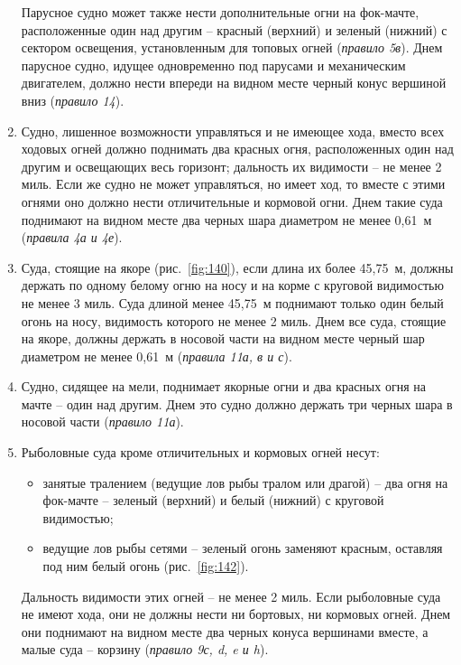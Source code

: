 \documentclass[a4paper, 12pt, twoside, final]{scrbook}
\begin{document}
\begin{enumerate}
Парусное судно может также нести дополнительные огни на фок-мачте, расположенные один над другим \--- красный (верхний) и зеленый (нижний) с сектором освещения, установленным для топовых огней (\textit{правило 5в}). Днем парусное судно, идущее одновременно под парусами и механическим двигателем, должно нести впереди на видном месте черный конус вершиной вниз (\textit{правило 14}).

\item Судно, лишенное возможности управляться и не имеющее хода, вместо всех ходовых огней должно поднимать два красных огня, расположенных один над другим и освещающих весь горизонт; дальность их видимости \--- не менее 2 миль. Если же судно не может управляться, но имеет ход, то вместе с этими огнями оно должно нести отличительные и кормовой огни. Днем такие суда поднимают на видном месте два черных шара диаметром не менее 0,61~м (\textit{правила 4а и 4е}).

\item Суда, стоящие на якоре (рис.~\ref{fig:140}), если длина их более 45,75~м, должны держать по одному белому огню на носу и на корме с круговой видимостью не менее 3 миль. Суда длиной менее 45,75~м поднимают только один белый огонь на носу, видимость которого не менее 2 миль. Днем все суда, стоящие на якоре, должны держать в носовой части на видном месте черный шар диаметром не менее 0,61~м (\textit{правила 11а, в и с}).

\item Судно, сидящее на мели, поднимает якорные огни и два красных огня на мачте \--- один над другим. Днем это судно должно держать три черных шара в носовой части (\textit{правило 11а}).

\item Рыболовные суда кроме отличительных и кормовых огней несут:
\begin{itemize}
\item занятые тралением (ведущие лов рыбы тралом или драгой) \--- два огня на фок-мачте \--- зеленый (верхний) и белый (нижний)  с круговой  видимостью;
\item ведущие лов рыбы сетями \--- зеленый огонь заменяют красным, оставляя под ним белый огонь (рис.~\ref{fig:142}).
\end{itemize}

Дальность видимости этих огней \--- не менее 2 миль. Если рыболовные суда не имеют хода, они не должны нести ни бортовых, ни кормовых огней. Днем они поднимают на видном месте два черных конуса вершинами вместе, а малые суда \--- корзину (\textit{правило 9с, d, e и h}).

\end{enumerate}
\end{document}
